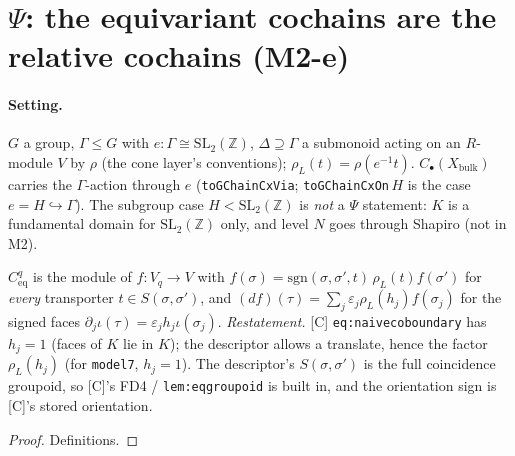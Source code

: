 \section{\texorpdfstring{$\Psi$}{Psi}: the equivariant cochains are the relative cochains (M2-e)}

\paragraph{Setting.} $G$ a group, $\Gamma\le G$ with $e:\Gamma\cong\mathrm{SL}_2(\mathbb Z)$, $\Delta\supseteq\Gamma$ a submonoid acting
on an $R$-module $V$ by $\rho$ (the cone layer's conventions); $\rho_L(t)=\rho(e^{-1}t)$. $C_\bullet(X_{\mathrm{bulk}})$ carries the
$\Gamma$-action through $e$ (\texttt{toGChainCxVia}; \texttt{toGChainCxOn}\,$H$ is the case $e=H\hookrightarrow\Gamma$). The
subgroup case $H<\mathrm{SL}_2(\mathbb Z)$ is \emph{not} a $\Psi$ statement: $K$ is a fundamental domain for $\mathrm{SL}_2(\mathbb Z)$
only, and level $N$ goes through Shapiro (not in M2).

\begin{definition}\label{def:relcx}
  \leanok
  $C^q_{\mathrm{eq}}$ is the module of $f:V_q\to V$ with $f(\sigma)=\mathrm{sgn}(\sigma,\sigma',t)\,\rho_L(t)f(\sigma')$ for
  \emph{every} transporter $t\in S(\sigma,\sigma')$, and $(df)(\tau)=\sum_j\varepsilon_j\rho_L(h_j)f(\sigma_j)$ for the signed
  faces $\partial_j\iota(\tau)=\varepsilon_jh_j\iota(\sigma_j)$.
  \emph{Restatement.} [C] \texttt{eq:naivecoboundary} has $h_j=1$ (faces of $K$ lie in $K$); the descriptor allows a translate,
  hence the factor $\rho_L(h_j)$ (for \texttt{model7}, $h_j=1$). The descriptor's $S(\sigma,\sigma')$ is the full coincidence
  groupoid, so [C]'s FD4 / \texttt{lem:eqgroupoid} is built in, and the orientation sign is [C]'s stored orientation.
\end{definition}
\begin{proof}
  \leanok
  Definitions.
\end{proof}

